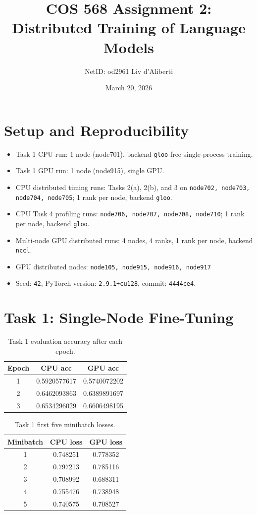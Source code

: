 \documentclass[11pt]{article}
\title{COS 568 Assignment 2: Distributed Training of Language Models}
\author{NetID: od2961 \quad Liv d'Aliberti}
\date{March 20, 2026}
\begin{document}
\maketitle

\section{Setup and Reproducibility}
\begin{itemize}
\item Task 1 CPU run: 1 node (node701), backend \texttt{gloo}-free single-process training.
\item Task 1 GPU run: 1 node (node915), single GPU.
\item CPU distributed timing runs: Tasks 2(a), 2(b), and 3 on \texttt{node702, node703, node704, node705}; 1 rank per node, backend \texttt{gloo}.
\item CPU Task 4 profiling runs: \texttt{node706, node707, node708, node710}; 1 rank per node, backend \texttt{gloo}.
\item Multi-node GPU distributed runs: 4 nodes, 4 ranks, 1 rank per node, backend \texttt{nccl}.
\item GPU distributed nodes: \texttt{node105, node915, node916, node917}
\item Seed: \texttt{42}, PyTorch version: \texttt{2.9.1+cu128}, commit: \texttt{4444ce4}.
\end{itemize}

\section{Task 1: Single-Node Fine-Tuning}
\begin{table}[H]
\centering
\begin{tabular}{ccc}
\toprule
Epoch & CPU acc & GPU acc \\
\midrule
1 & 0.5920577617 & 0.5740072202 \\
2 & 0.6462093863 & 0.6389891697 \\
3 & 0.6534296029 & 0.6606498195 \\
\bottomrule
\end{tabular}
\caption{Task 1 evaluation accuracy after each epoch.}
\end{table}

\begin{table}[H]
\centering
\begin{tabular}{ccc}
\toprule
Minibatch & CPU loss & GPU loss \\
\midrule
1 & 0.748251 & 0.778352 \\
2 & 0.797213 & 0.785116 \\
3 & 0.708992 & 0.688311 \\
4 & 0.755476 & 0.738948 \\
5 & 0.740575 & 0.708527 \\
\bottomrule
\end{tabular}
\caption{Task 1 first five minibatch losses.}
\end{table}
\end{document}
